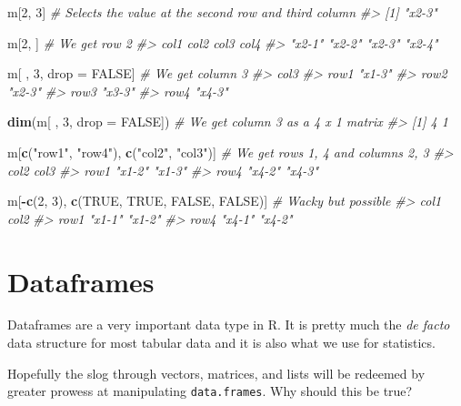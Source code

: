 \documentclass[]{book}
\newenvironment{Shaded}{\begin{snugshade}}{\end{snugshade}}
\newcommand{\KeywordTok}[1]{\textcolor[rgb]{0.13,0.29,0.53}{\textbf{#1}}}
\newcommand{\DataTypeTok}[1]{\textcolor[rgb]{0.13,0.29,0.53}{#1}}
\newcommand{\DecValTok}[1]{\textcolor[rgb]{0.00,0.00,0.81}{#1}}
\newcommand{\StringTok}[1]{\textcolor[rgb]{0.31,0.60,0.02}{#1}}
\newcommand{\CommentTok}[1]{\textcolor[rgb]{0.56,0.35,0.01}{\textit{#1}}}
\newcommand{\OtherTok}[1]{\textcolor[rgb]{0.56,0.35,0.01}{#1}}
\newcommand{\OperatorTok}[1]{\textcolor[rgb]{0.81,0.36,0.00}{\textbf{#1}}}
\newcommand{\NormalTok}[1]{#1}
\begin{document}
\begin{Shaded}
\begin{Highlighting}[]
\NormalTok{m[}\DecValTok{2}\NormalTok{, }\DecValTok{3}\NormalTok{] }\CommentTok{# Selects the value at the second row and third column}
\CommentTok{#> [1] "x2-3"}

\NormalTok{m[}\DecValTok{2}\NormalTok{, ] }\CommentTok{# We get row 2}
\CommentTok{#>   col1   col2   col3   col4 }
\CommentTok{#> "x2-1" "x2-2" "x2-3" "x2-4"}

\NormalTok{m[ , }\DecValTok{3}\NormalTok{, drop =}\StringTok{ }\OtherTok{FALSE}\NormalTok{] }\CommentTok{# We get column 3}
\CommentTok{#>      col3  }
\CommentTok{#> row1 "x1-3"}
\CommentTok{#> row2 "x2-3"}
\CommentTok{#> row3 "x3-3"}
\CommentTok{#> row4 "x4-3"}

\KeywordTok{dim}\NormalTok{(m[ , }\DecValTok{3}\NormalTok{, }\DataTypeTok{drop =} \OtherTok{FALSE}\NormalTok{]) }\CommentTok{# We get column 3 as a 4 x 1 matrix}
\CommentTok{#> [1] 4 1}

\NormalTok{m[}\KeywordTok{c}\NormalTok{(}\StringTok{"row1"}\NormalTok{, }\StringTok{"row4"}\NormalTok{), }\KeywordTok{c}\NormalTok{(}\StringTok{"col2"}\NormalTok{, }\StringTok{"col3"}\NormalTok{)] }\CommentTok{# We get rows 1, 4 and columns 2, 3}
\CommentTok{#>      col2   col3  }
\CommentTok{#> row1 "x1-2" "x1-3"}
\CommentTok{#> row4 "x4-2" "x4-3"}

\NormalTok{m[}\OperatorTok{-}\KeywordTok{c}\NormalTok{(}\DecValTok{2}\NormalTok{, }\DecValTok{3}\NormalTok{), }\KeywordTok{c}\NormalTok{(}\OtherTok{TRUE}\NormalTok{, }\OtherTok{TRUE}\NormalTok{, }\OtherTok{FALSE}\NormalTok{, }\OtherTok{FALSE}\NormalTok{)] }\CommentTok{# Wacky but possible}
\CommentTok{#>      col1   col2  }
\CommentTok{#> row1 "x1-1" "x1-2"}
\CommentTok{#> row4 "x4-1" "x4-2"}
\end{Highlighting}
\end{Shaded}

\hypertarget{dataframes}{\section{Dataframes}\label{dataframes}}

Dataframes are a very important data type in R. It is pretty much the
\emph{de facto} data structure for most tabular data and it is also what
we use for statistics.

Hopefully the slog through vectors, matrices, and lists will be redeemed
by greater prowess at manipulating \texttt{data.frames}. Why should this
be true?
\end{document}
